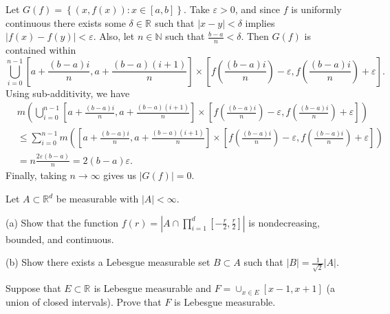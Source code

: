 \begin{solution}
  Let $G(f) = \left\{ (x,f(x)) : x \in [a,b] \right\}$.
  Take $\varepsilon > 0$, and since $f$ is uniformly continuous there exists some $\delta \in \mathbb{R}^{}$ such that $\left| x - y \right| < \delta$ implies $\left| f(x) - f(y) \right|<\varepsilon$.
  Also, let $n \in \mathbb{N}$ such that $\frac{b-a}{n} < \delta$.
  Then $G(f)$ is contained within 
  \[
    \bigcup_{i=0}^{n-1} \left[a + \frac{(b-a)i}{n}, a + \frac{(b-a)(i+1)}{n} \right] \times \left[ f\left( \frac{(b-a)i}{n} \right) - \varepsilon, f\left( \frac{(b-a)i}{n}\right)  + \varepsilon \right]
  .\] 
  Using sub-additivity, we have
  \begin{equation*}
    \begin{split}
      &m\left( \bigcup_{i=0}^{n-1} \left[a + \frac{(b-a)i}{n}, a + \frac{(b-a)(i+1)}{n} \right] \times \left[ f\left( \frac{(b-a)i}{n} \right) - \varepsilon, f\left( \frac{(b-a)i}{n}\right)  + \varepsilon \right] \right) \\ 
      &\leq \sum_{i=0}^{n-1} m\left(  \left[a + \frac{(b-a)i}{n}, a + \frac{(b-a)(i+1)}{n} \right] \times \left[ f\left( \frac{(b-a)i}{n} \right) - \varepsilon, f\left( \frac{(b-a)i}{n}\right)  + \varepsilon \right] \right)\\
      &= n \frac{2\varepsilon(b-a)}{n} = 2(b-a)\varepsilon.
    \end{split}
  \end{equation*}
  Finally, taking $n \to \infty$ gives us $\left| G(f) \right| = 0$.

\end{solution}

\pagebreak

\begin{problem}{3}
Let $A \subset \mathbb{R}^{d}$ be measurable with $|A| < \infty$.

(a) Show that the function $f(r) = \left| A \cap \prod_{i=1}^{d } [-\frac{r}{2}, \frac{r}{2}] \right|$ is nondecreasing, bounded, and continuous.

(b) Show there exists a Lebesgue measurable set $B \subset A$ such that $\left| B \right| = \frac{1}{\sqrt{2} } \left| A \right|$.
\end{problem}

\begin{solution}
\end{solution}

\begin{problem}{4}
Suppose that $E \subset \mathbb{R}^{}$ is Lebesgue measurable and $F = \cup_{x \in E}^{} \left[ x-1,x+1 \right]$ (a union of closed intervals).
Prove that $F$ is Lebesgue measurable.
\end{problem}


